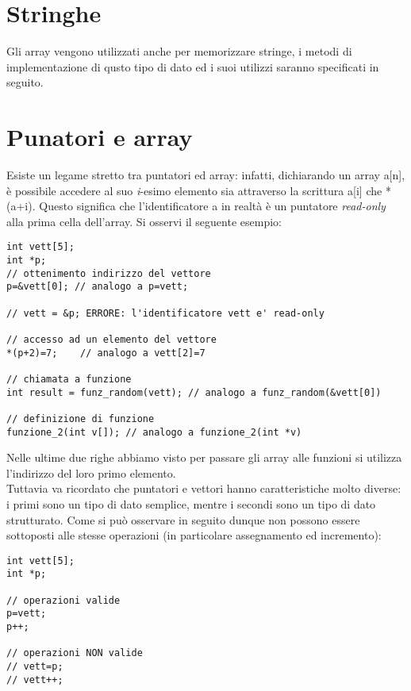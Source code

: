 \section{Stringhe}
Gli array vengono utilizzati anche per memorizzare stringe, i metodi di implementazione di qusto tipo di dato ed i suoi utilizzi saranno specificati in seguito.

\section{Punatori e array}
Esiste un legame stretto tra puntatori ed array: infatti, dichiarando un array \colorbox{light-gray}{a[n]}, è possibile accedere al suo \textit{i}-esimo elemento sia attraverso la scrittura \colorbox{light-gray}{a[i]} che \colorbox{light-gray}{*(a+i)}. Questo significa che l'identificatore \colorbox{light-gray}{a} in realtà è un puntatore \textit{read-only} alla prima cella dell'array. Si osservi il seguente esempio:
\begin{lstlisting}[title={Utilizzo di puntatori come array}]
int vett[5];
int *p;
// ottenimento indirizzo del vettore
p=&vett[0]; // analogo a p=vett;

// vett = &p; ERRORE: l'identificatore vett e' read-only

// accesso ad un elemento del vettore
*(p+2)=7;    // analogo a vett[2]=7

// chiamata a funzione
int result = funz_random(vett); // analogo a funz_random(&vett[0])

// definizione di funzione
funzione_2(int v[]); // analogo a funzione_2(int *v)
\end{lstlisting}

Nelle ultime due righe abbiamo visto per passare gli array alle funzioni si utilizza l'indirizzo del loro primo elemento.\\
Tuttavia va ricordato che puntatori e vettori hanno caratteristiche molto diverse: i primi sono un tipo di dato semplice, mentre i secondi sono un tipo di dato strutturato. Come si può osservare in seguito dunque non possono essere sottoposti alle stesse operazioni (in particolare assegnamento ed incremento):
\begin{lstlisting}[title={Differenze puntatori/array}]
int vett[5];
int *p;

// operazioni valide
p=vett;
p++;

// operazioni NON valide
// vett=p;
// vett++;
\end{lstlisting}

